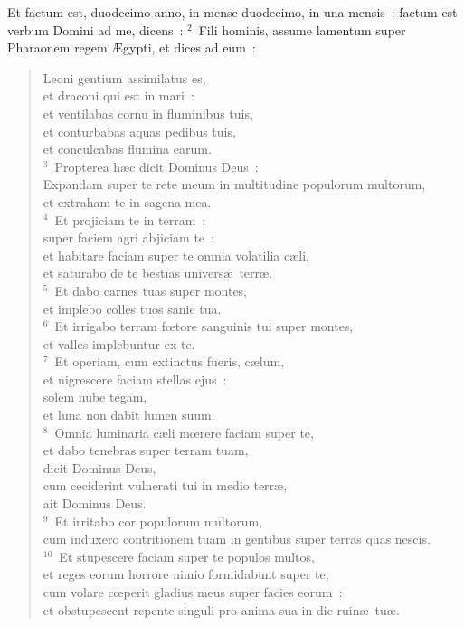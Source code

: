 \lettrine[lines=10,image=true,loversize=0.05,lraise=-0.03]{E}{}t factum est, duodecimo anno, in mense duodecimo, in una mensis~: factum est verbum Domini ad me, dicens~:
${}^{2}$~Fili hominis, assume lamentum super Pharaonem regem \AE gypti, et dices ad eum~: \begin{flushleft}\begin{verse}Leoni gentium assimilatus es,\\ et draconi qui est in mari~:\\ et ventilabas cornu in fluminibus tuis,\\ et conturbabas aquas pedibus tuis,\\ et conculcabas flumina earum.\\
${}^{3}$~Propterea h\ae c dicit Dominus Deus~:\\ Expandam super te rete meum in multitudine populorum multorum,\\ et extraham te in sagena mea.\\
${}^{4}$~Et projiciam te in terram~;\\ super faciem agri abjiciam te~:\\ et habitare faciam super te omnia volatilia c\ae li,\\ et saturabo de te bestias univers\ae\ terr\ae .\\
${}^{5}$~Et dabo carnes tuas super montes,\\ et implebo colles tuos sanie tua.\\
${}^{6}$~Et irrigabo terram fœtore sanguinis tui super montes,\\ et valles implebuntur ex te.\\
${}^{7}$~Et operiam, cum extinctus fueris, c\ae lum,\\ et nigrescere faciam stellas ejus~:\\ solem nube tegam,\\ et luna non dabit lumen suum.\\
${}^{8}$~Omnia luminaria c\ae li mœrere faciam super te,\\ et dabo tenebras super terram tuam,\\ dicit Dominus Deus,\\ cum ceciderint vulnerati tui in medio terr\ae ,\\ ait Dominus Deus.\\
${}^{9}$~Et irritabo cor populorum multorum,\\ cum induxero contritionem tuam in gentibus super terras quas nescis.\\
${}^{10}$~Et stupescere faciam super te populos multos,\\ et reges eorum horrore nimio formidabunt super te,\\ cum volare cœperit gladius meus super facies eorum~:\\ et obstupescent repente singuli pro anima sua in die ruin\ae\ tu\ae .\\

\end{verse}
\end{flushleft}
